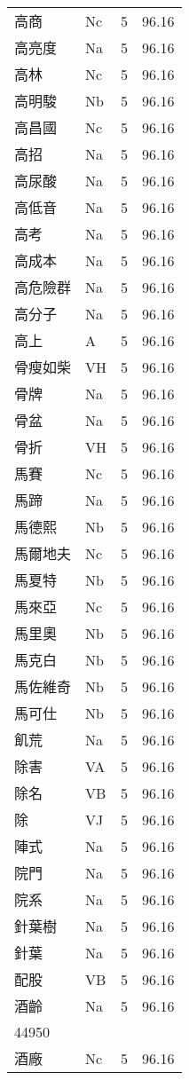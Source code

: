 \documentclass[twocolumn]{book}
\begin{document}
\begin{supertabular}{llrr}
高商 & Nc & 5 &  96.16\\
高亮度 & Na & 5 &  96.16\\
高林 & Nc & 5 &  96.16\\
高明駿 & Nb & 5 &  96.16\\
高昌國 & Nc & 5 &  96.16\\
高招 & Na & 5 &  96.16\\
高尿酸 & Na & 5 &  96.16\\
高低音 & Na & 5 &  96.16\\
高考 & Na & 5 &  96.16\\
高成本 & Na & 5 &  96.16\\
高危險群 & Na & 5 &  96.16\\
高分子 & Na & 5 &  96.16\\
高上 & A & 5 &  96.16\\
骨瘦如柴 & VH & 5 &  96.16\\
骨牌 & Na & 5 &  96.16\\
骨盆 & Na & 5 &  96.16\\
骨折 & VH & 5 &  96.16\\
馬賽 & Nc & 5 &  96.16\\
馬蹄 & Na & 5 &  96.16\\
馬德熙 & Nb & 5 &  96.16\\
馬爾地夫 & Nc & 5 &  96.16\\
馬夏特 & Nb & 5 &  96.16\\
馬來亞 & Nc & 5 &  96.16\\
馬里奧 & Nb & 5 &  96.16\\
馬克白 & Nb & 5 &  96.16\\
馬佐維奇 & Nb & 5 &  96.16\\
馬可仕 & Nb & 5 &  96.16\\
飢荒 & Na & 5 &  96.16\\
除害 & VA & 5 &  96.16\\
除名 & VB & 5 &  96.16\\
除 & VJ & 5 &  96.16\\
陣式 & Na & 5 &  96.16\\
院門 & Na & 5 &  96.16\\
院系 & Na & 5 &  96.16\\
針葉樹 & Na & 5 &  96.16\\
針葉 & Na & 5 &  96.16\\
配股 & VB & 5 &  96.16\\
酒齡 & Na & 5 &  96.16\\
44950\\
酒廠 & Nc & 5 &  96.16\\

\end{supertabular}
\end{document}
